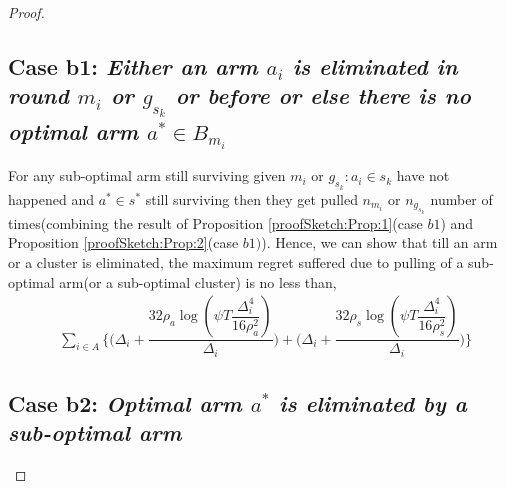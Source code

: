 \begin{proof}
\subsection*{Case b1: \textit{Either an arm $a_{i}$ is eliminated in round $m_{i}$ or $g_{s_{k}}$ or before or else there is no optimal arm $a^{*}\in B_{m_{i}}$}} 
 
	For any sub-optimal arm still surviving given $m_{i}$ or $g_{s_{k}}:a_{i}\in s_{k}$ have not happened and $a^{*}\in s^{*}$ still surviving then they get pulled $n_{m_{i}}$ or $n_{g_{s_{k}}}$ number of times(combining the result of Proposition \ref{proofSketch:Prop:1}(case $b1$) and Proposition \ref{proofSketch:Prop:2}(case $b1)$). Hence, we can show that till an arm or a cluster is eliminated, the maximum regret suffered due to pulling of a sub-optimal arm(or a sub-optimal cluster) is no less than,
 \begin{align*}
 &\sum_{i\in A}\bigg\lbrace\bigg(\Delta_{i}+\dfrac{32\rho_{a}\log{(\psi T\dfrac{\Delta_{i}^{4}}{16\rho_{a}^{2}})}}{\Delta_{i}}\bigg) + \bigg(\Delta_{i}+\dfrac{32\rho_{s}\log{(\psi T\dfrac{\Delta_{i}^{4}}{16\rho_{s}^{2}})}}{\Delta_{i}}\bigg)\bigg\rbrace 
 \end{align*}

 
\subsection*{Case b2: \textit{Optimal arm $a^{*}$ is eliminated by a sub-optimal arm}}
  

\end{proof}

